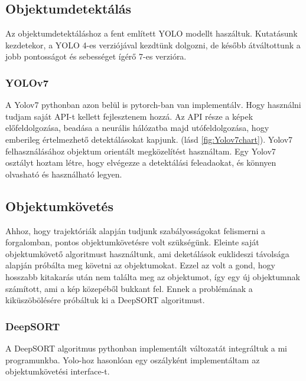 \documentclass[12pt,a4paper]{article}
\begin{document}
\subsection{Objektumdetektálás}
Az objektumdetektáláshoz a fent említett YOLO modellt haszáltuk. Kutatásunk kezdetekor, a YOLO 4-es verziójával kezdtünk dolgozni,
de később átváltottunk a jobb pontosságot és sebességet ígérő 7-es verzióra.
\subsubsection{YOLOv7}
A Yolov7 pythonban azon belül is pytorch-ban van implementálv. Hogy használni tudjam saját API-t kellett fejlesztenem hozzá.
Az API része a képek előfeldolgozása, beadása a neurális hálózatba majd utófeldolgozása, hogy emberileg értelmezhető detektálásokat
kapjunk. (lásd \ref{fig:Yolov7chart}).
Yolov7 felhasználásához objektum orientált megközelítést használtam. Egy Yolov7 osztályt hoztam létre, hogy elvégezze a detektálási feleadaokat,
és könnyen olvasható és használható legyen.
\subsection{Objektumkövetés}
Ahhoz, hogy trajektóriák alapján tudjunk szabályosságokat felismerni a forgalomban, pontos objektumkövetésre volt szükségünk. Eleinte
saját objektumkövető algoritmust használtunk, ami deketálások euklideszi távolsága alapján próbálta meg követni az objektumokat.
Ezzel az volt a gond, hogy hosszabb kitakarás után nem találta meg az objektumot, így egy új objektumnak számított, ami a kép
közepéből bukkant fel. Ennek a problémának a kiküszöbölésére próbáltuk ki a DeepSORT algoritmust.
\subsubsection{DeepSORT}
A DeepSORT algoritmus pythonban implementált változatát integráltuk a mi programunkba. Yolo-hoz hasonlóan egy oszályként implementáltam az objektumkövetési
interface-t.
\end{document}
